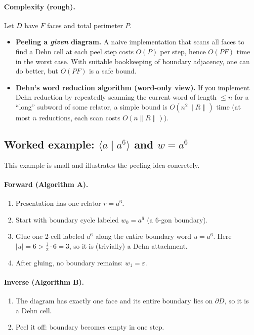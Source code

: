 \documentclass[11pt]{article}
\theoremstyle{definition}
\theoremstyle{plain}
\theoremstyle{remark}
\begin{document}
\paragraph{Complexity (rough).}\cite{lyndonschupp1977}
Let $D$ have $F$ faces and total perimeter $P$.
\begin{itemize}[leftmargin=2em]
\item \textbf{Peeling a \emph{given} diagram.} A naive implementation that scans all faces to find a Dehn cell at each peel step costs $O(P)$ per step, hence $O(PF)$ time in the worst case.
With suitable bookkeeping of boundary adjacency, one can do better, but $O(PF)$ is a safe bound.
\item \textbf{Dehn's word reduction algorithm (word-only view).} If you implement Dehn reduction by repeatedly scanning the current word of length $\le n$ for a ``long'' subword of some relator, a simple bound is $O(n^2\|R\|)$ time (at most $n$ reductions, each scan costs $O(n\|R\|)$).
\end{itemize}
\subsection*{Worked example: $\langle a\mid a^6\rangle$ and $w=a^6$}
This example is small and illustrates the peeling idea concretely.

\paragraph{Forward (Algorithm A).}
\begin{enumerate}[leftmargin=2.2em]
\item Presentation has one relator $r=a^6$.
\item Start with boundary cycle labeled $w_0=a^6$ (a 6-gon boundary).
\item Glue one 2-cell labeled $a^6$ along the entire boundary word $u=a^6$.
Here $|u|=6>\tfrac12\cdot 6=3$, so it is (trivially) a Dehn attachment.
\item After gluing, no boundary remains: $w_1=\varepsilon$.
\end{enumerate}

\paragraph{Inverse (Algorithm B).}
\begin{enumerate}[leftmargin=2.2em]
\item The diagram has exactly one face and its entire boundary lies on $\partial D$, so it is a Dehn cell.
\item Peel it off: boundary becomes empty in one step.
\end{enumerate}
\end{document}
